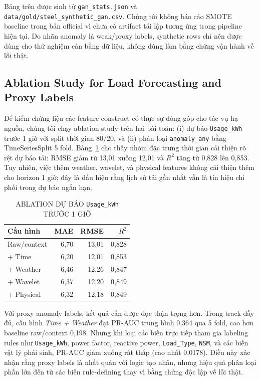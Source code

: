 Bảng trên được sinh từ \texttt{gan\_stats.json} và \texttt{data/gold/steel\_synthetic\_gan.csv}.
Chúng tôi không báo cáo SMOTE baseline trong bản official vì chưa có artifact tái lập tương ứng trong pipeline hiện tại.
Do nhãn anomaly là weak/proxy labels, synthetic rows chỉ nên được dùng cho thử nghiệm cân bằng dữ liệu, không dùng làm bằng chứng vận hành về lỗi thật.

\subsection{Ablation Study for Load Forecasting and Proxy Labels}

Để kiểm chứng liệu các feature construct có thực sự đóng góp cho tác vụ hạ nguồn,
chúng tôi chạy ablation study trên hai bài toán: (i) dự báo \texttt{Usage\_kWh} trước 1 giờ
với split thời gian 80/20, và (ii) phân loại \texttt{anomaly\_any} bằng TimeSeriesSplit 5 fold.
Bảng~\ref{tab:ablation_forecast} cho thấy nhóm đặc trưng thời gian cải thiện rõ rệt dự báo tải:
RMSE giảm từ 13,01 xuống 12,01 và $R^2$ tăng từ 0,828 lên 0,853.
Tuy nhiên, việc thêm weather, wavelet, và physical features không cải thiện thêm cho horizon 1 giờ;
đây là dấu hiệu rằng lịch sử tải gần nhất vẫn là tín hiệu chi phối trong dự báo ngắn hạn.

\begin{table}[htbp]
\caption{ABLATION DỰ BÁO \texttt{Usage\_kWh} TRƯỚC 1 GIỜ}
\label{tab:ablation_forecast}
\centering
\small
\begin{tabular}{@{}lrrr@{}}
\toprule
Cấu hình & MAE & RMSE & $R^2$ \\
\midrule
Raw/context & 6,70 & 13,01 & 0,828 \\
+ Time & 6,20 & 12,01 & 0,853 \\
+ Weather & 6,46 & 12,26 & 0,847 \\
+ Wavelet & 6,37 & 12,20 & 0,849 \\
+ Physical & 6,32 & 12,18 & 0,849 \\
\bottomrule
\end{tabular}
\end{table}

Với proxy anomaly labels, kết quả cần được đọc thận trọng hơn.
Trong track đầy đủ, cấu hình \textit{Time + Weather} đạt PR-AUC trung bình 0,364 qua 5 fold,
cao hơn baseline raw/context 0,198.
Nhưng khi loại các biến trực tiếp tham gia labeling rules như \texttt{Usage\_kWh}, power factor,
reactive power, \texttt{Load\_Type}, \texttt{NSM}, và các biến vật lý phái sinh, PR-AUC giảm xuống rất thấp
(cao nhất 0,0178). Điều này xác nhận rằng proxy labels là nhất quán với logic tạo nhãn,
nhưng hiệu quả phân loại phần lớn đến từ các biến rule-defining thay vì bằng chứng độc lập về lỗi thật.


